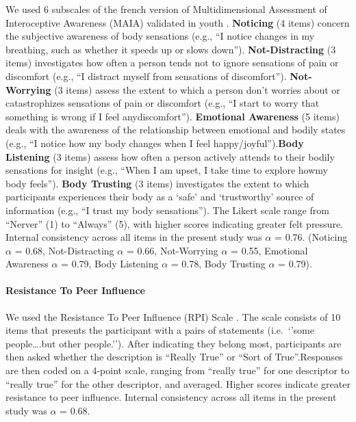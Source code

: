 \documentclass[preprint, 3p,
authoryear]{elsarticle} %
\begin{document}
We used 6 subscales of the french version of Multidimensional Assessment
of Interoceptive Awareness (MAIA) \citep{mehling_multidimensional_2012}
validated in youth \citep{jones_exploring_2021}. \textbf{Noticing} (4
items) concern the subjective awareness of body sensations (e.g., ``I
notice changes in my breathing, such as whether it speeds up or slows
down''). \textbf{Not-Distracting} (3 items) investigates how often a
person tends not to ignore sensations of pain or discomfort (e.g., ``I
distract myself from sensations of discomfort''). \textbf{Not-Worrying}
(3 items) assess the extent to which a person don't worries about or
catastrophizes sensations of pain or discomfort (e.g., ``I start to
worry that something is wrong if I feel anydiscomfort'').
\textbf{Emotional Awareness} (5 items) deals with the awareness of the
relationship between emotional and bodily states (e.g., ``I notice how
my body changes when I feel happy/joyful'').\textbf{Body Listening} (3
items) assess how often a person actively attends to their bodily
sensations for insight (e.g., ``When I am upset, I take time to explore
howmy body feels''). \textbf{Body Trusting} (3 items) investigates the
extent to which participants experiences their body as a `safe' and
`trustworthy' source of information (e.g., ``I trust my body
sensations''). The Likert scale range from ``Nerver'' (1) to ``Always''
(5), with higher scores indicating greater felt pressure. Internal
consistency across all items in the present study was \(\alpha\) = 0.76.
(Noticing \(\alpha\) = 0.68, Not-Distracting \(\alpha\) = 0.66,
Not-Worrying \(\alpha\) = 0.55, Emotional Awareness \(\alpha\) = 0.79,
Body Listening \(\alpha\) = 0.78, Body Trusting \(\alpha\) = 0.79).

\hypertarget{resistance-to-peer-influence}{%
\paragraph{Resistance To Peer
Influence}\label{resistance-to-peer-influence}}

We used the Resistance To Peer Influence (RPI) Scale
\citep{steinberg_age_2007}. The scale consists of 10 items that presents
the participant with a pairs of statements (i.e.~`'some people\ldots.but
other people.''). After indicating they belong most, participants are
then asked whether the description is ``Really True'' or ``Sort of
True''.Responses are then coded on a 4-point scale, ranging from
``really true'' for one descriptor to ``really true'' for the other
descriptor, and averaged. Higher scores indicate greater resistance to
peer influence. Internal consistency across all items in the present
study was \(\alpha\) = 0.68.
\end{document}

